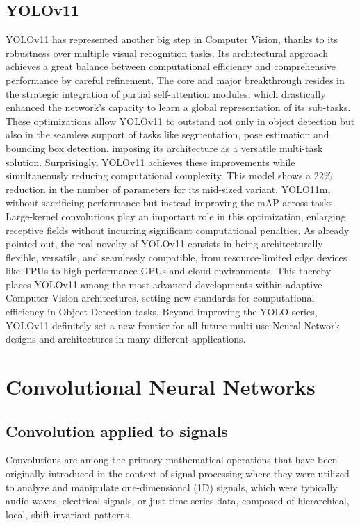 \subsection{YOLOv11}
YOLOv11 has represented another big step in Computer Vision, thanks to its robustness over multiple visual recognition tasks. Its architectural approach achieves a great balance between computational efficiency and comprehensive performance by careful refinement.
The core and major breakthrough resides in the strategic integration of partial self-attention modules, which drastically enhanced the network's capacity to learn a global representation of its sub-tasks. These optimizations allow YOLOv11 to outstand not only in object detection but also in the seamless support of tasks like segmentation, pose estimation and bounding box detection, imposing its architecture as a versatile multi-task solution.
Surprisingly, YOLOv11 achieves these improvements while simultaneously reducing computational complexity. This model shows a 22\% reduction in the number of parameters for its mid-sized variant, YOLO11m, without sacrificing performance but instead improving the mAP across tasks. Large-kernel convolutions play an important role in this optimization, enlarging receptive fields without incurring significant computational penalties.
As already pointed out, the real novelty of YOLOv11 consists in being architecturally flexible, versatile, and seamlessly compatible, from resource-limited edge devices like TPUs to high-performance GPUs and cloud environments. This thereby places YOLOv11 among the most advanced developments within adaptive Computer Vision architectures, setting new standards for computational efficiency in Object Detection tasks. Beyond improving the YOLO series, YOLOv11 definitely set a new frontier for all future multi-use Neural Network designs and architectures in many different applications.

\section{Convolutional Neural Networks}

\subsection{Convolution applied to signals}
Convolutions are among the primary mathematical operations that have been originally introduced in the context of signal processing where they were utilized to analyze and manipulate one-dimensional (1D) signals, which were typically audio waves, electrical signals, or just time-series data, composed of hierarchical, local, shift-invariant patterns.

